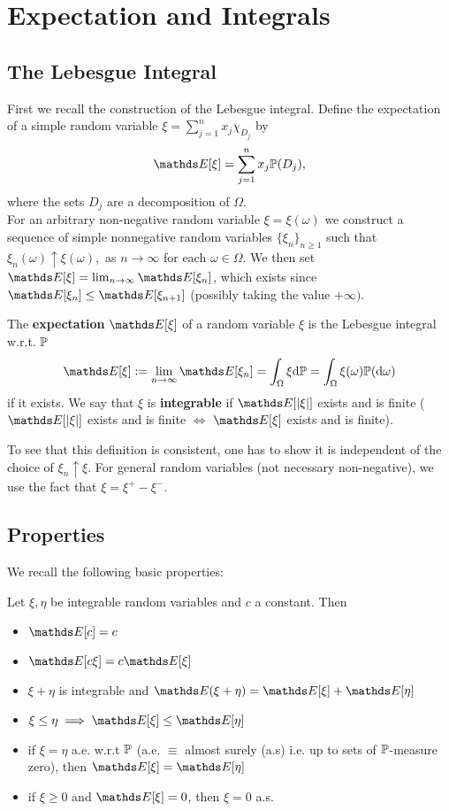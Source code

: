 \section{Expectation and Integrals}
\subsection{The Lebesgue Integral}
First we recall the construction of the Lebesgue integral. Define the expectation of a simple random variable $\xi = \sum_{j=1}^n x_j \chi_{D_j}$ by
\begin{equation}
    \E [\xi] = \sum_{j=1}^n x_j \p(D_j),
\end{equation}
where the sets $D_j$ are a decomposition of $\Omega$. \\

For an arbitrary non-negative random variable $\xi = \xi(\omega)$ we construct a sequence of simple nonnegative random variables $\{\xi_n \}_{n\ge1}$ such that $\xi_n(\omega) \uparrow \xi(\omega),$ as $n \rightarrow \infty$ for each $\omega \in \Omega$. We then set $\E[\xi] = \lim_{n \rightarrow \infty} \E[\xi_n]$, which exists since $\E[\xi_n] \le \E[\xi_{n+1}]$ (possibly taking the value $+\infty)$.
\begin{definition}[Expectation]
The \textbf{expectation} $\E[\xi]$ of a random variable $\xi$ is the Lebesgue integral w.r.t. $\mathbb{P}$
\begin{equation}
    \E[\xi] := \lim_{n \rightarrow \infty}\E[\xi_n] =  \int_{\Omega}\xi \d\p = \int_{\Omega} \xi(\omega) \p(\d \omega)
\end{equation}
if it exists. We say that $\xi$ is \textbf{integrable} if $\E[|\xi|]$ exists and is finite ($\E[|\xi|]$ exists and is finite $\iff$ $\E[\xi]$ exists and is finite).
\end{definition}
To see that this definition is consistent, one has to show it is independent of the choice of $\xi_n \uparrow \xi$. For general random variables (not necessary non-negative), we use the fact that $\xi = \xi^+ - \xi^-$.

\subsection{Properties}
We recall the following basic properties:
\begin{property}
Let $\xi, \eta$ be integrable random variables and $c$ a constant. Then 
\begin{itemize}
    \item $\E [c] = c$
    \item $\E [c\xi] = c\E[\xi]$
    \item $\xi + \eta$ is integrable and $\E(\xi + \eta) = \E[\xi] + \E[\eta]$
    \item $\xi \le \eta \implies \E[\xi] \le \E[\eta]$
    \item if $\xi = \eta$ a.e. w.r.t $\mathbb{P}$ (a.e. $\equiv$ almost surely (a.s) i.e. up to sets of $\mathbb{P}$-measure zero), then $\E[\xi] = \E[\eta]$
    \item if $\xi \ge 0$ and $\E[\xi] = 0$, then $\xi = 0$ a.s.
\end{itemize}
\end{property}

